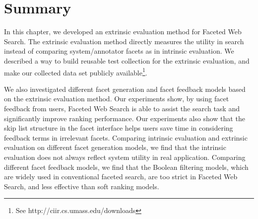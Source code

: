 \section{Summary} 
\label{sec:ee-conclusions}
In this chapter, we developed an extrinsic evaluation method for Faceted Web Search. The extrinsic evaluation method directly measures the utility in search instead of comparing system/annotator facets as in intrinsic evaluation. We described a way to build reusable test collection for the extrinsic evaluation, and make our collected data set publicly available\footnote{See http://ciir.cs.umass.edu/downloads}.

We also investigated different facet generation and facet feedback models based on the extrinsic evaluation method.
Our experiments show, by using facet feedback from users, Faceted Web Search is able to assist the search task and significantly improve ranking performance. Our experiments also show that the skip list structure in the facet interface helps users save time in considering feedback terms in irrelevant facets. Comparing intrinsic evaluation and extrinsic evaluation on different facet generation models, we find that the intrinsic evaluation does not always reflect system utility in real application. Comparing different facet feedback models, we find that the Boolean filtering models, which are widely used in conventional faceted search, are too strict in Faceted Web Search, and less effective than soft ranking models.
